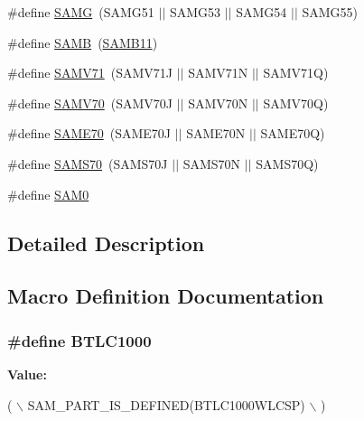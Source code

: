 \begin{DoxyCompactItemize}
\item 
\#define \hyperlink{group__sam__part__macros__group_gad4ae7782abc1e1087067d9958af3381c}{S\+A\+M\+G}~(S\+A\+M\+G51 $\vert$$\vert$ S\+A\+M\+G53 $\vert$$\vert$ S\+A\+M\+G54 $\vert$$\vert$ S\+A\+M\+G55)
\item 
\#define \hyperlink{group__sam__part__macros__group_gafee38ed5a47634705a32ff589210928a}{S\+A\+M\+B}~(\hyperlink{group__sam__part__macros__group_ga2af5455979bc458995adea5aaa7807a2}{S\+A\+M\+B11})
\item 
\#define \hyperlink{group__sam__part__macros__group_ga3244695e750cd101d85bdfbc8802c5e9}{S\+A\+M\+V71}~(S\+A\+M\+V71\+J $\vert$$\vert$ S\+A\+M\+V71\+N $\vert$$\vert$ S\+A\+M\+V71\+Q)
\item 
\#define \hyperlink{group__sam__part__macros__group_gab470f27e045fe99f2b64bb30d5802282}{S\+A\+M\+V70}~(S\+A\+M\+V70\+J $\vert$$\vert$ S\+A\+M\+V70\+N $\vert$$\vert$ S\+A\+M\+V70\+Q)
\item 
\#define \hyperlink{group__sam__part__macros__group_ga8da58f3ee3f8d5ca1f6657745667f38e}{S\+A\+M\+E70}~(S\+A\+M\+E70\+J $\vert$$\vert$ S\+A\+M\+E70\+N $\vert$$\vert$ S\+A\+M\+E70\+Q)
\item 
\#define \hyperlink{group__sam__part__macros__group_ga8d375463839ea94bd1bdbe23a1f87213}{S\+A\+M\+S70}~(S\+A\+M\+S70\+J $\vert$$\vert$ S\+A\+M\+S70\+N $\vert$$\vert$ S\+A\+M\+S70\+Q)
\item 
\#define \hyperlink{group__sam__part__macros__group_ga5f347b54588ccfc00042a0272f1c0306}{S\+A\+M0}
\end{DoxyCompactItemize}


\subsection{Detailed Description}


\subsection{Macro Definition Documentation}
\hypertarget{group__sam__part__macros__group_gaa7c0614df11bc3398897ee31d038dde7}{}
\subsubsection[{B\+T\+L\+C1000}]{\setlength{\rightskip}{0pt plus 5cm}\#define B\+T\+L\+C1000}\label{group__sam__part__macros__group_gaa7c0614df11bc3398897ee31d038dde7}
{\bfseries Value\+:}
\begin{DoxyCode}
( \(\backslash\)
        SAM\_PART\_IS\_DEFINED(BTLC1000WLCSP) \(\backslash\)
    )
\end{DoxyCode}
\hypertarget{group__sam__part__macros__group_ga0184d5fd98854f0e40eef3a27de91fed}{}
